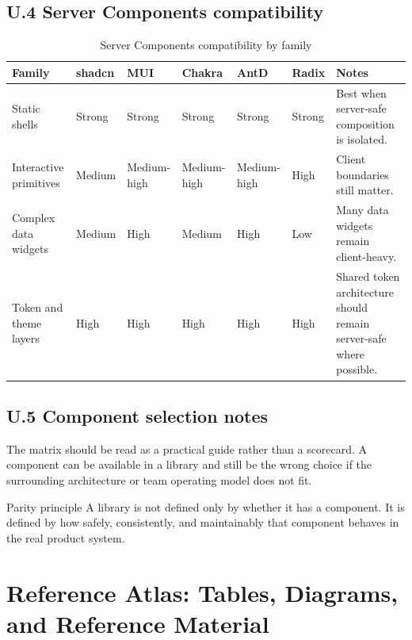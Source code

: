 \subsection*{U.4 Server Components compatibility}
\begin{table}[htbp]
  \centering
  \caption{Server Components compatibility by family}
  \begin{tabularx}{\textwidth}{@{}p{}p{}p{}p{}p{}p{}Y@{}}
    \toprule
    \textbf{Family} & \textbf{shadcn} & \textbf{MUI} & \textbf{Chakra} & \textbf{AntD} & \textbf{Radix} & \textbf{Notes} \\
    \midrule
    Static shells & Strong & Strong & Strong & Strong & Strong & Best when server-safe composition is isolated. \\
    Interactive primitives & Medium & Medium-high & Medium-high & Medium-high & High & Client boundaries still matter. \\
    Complex data widgets & Medium & High & Medium & High & Low & Many data widgets remain client-heavy. \\
    Token and theme layers & High & High & High & High & High & Shared token architecture should remain server-safe where possible. \\
    \bottomrule
  \end{tabularx}
\end{table}

\subsection*{U.5 Component selection notes}
The matrix should be read as a practical guide rather than a scorecard. A component can be available in a library and still be the wrong choice if the surrounding architecture or team operating model does not fit.

\begin{highlightbox}{Parity principle}
A library is not defined only by whether it has a component. It is defined by how safely, consistently, and maintainably that component behaves in the real product system.
\end{highlightbox}

\clearpage
{}
\section*{Reference Atlas: Tables, Diagrams, and Reference Material}

